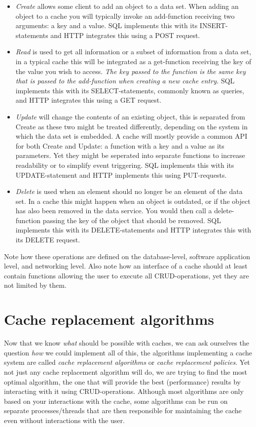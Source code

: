 \documentclass[pdftex,a4paper,12pt,twoside]{report}
\begin{document}
\begin{itemize}
\item \emph{Create} allows some client to add an object to a data set. When adding an object to a cache you will typically invoke an add-function receiving two arguments: a key and a value. SQL implements this with its INSERT-statements and HTTP integrates this using a POST request.
\item \emph{Read} is used to get all information or a subset of information from a data set, in a typical cache this will be integrated as a get-function receiving
the key of the value you wish to access. \emph{The key passed to the function is the same key that is passed to the add-function when creating a new cache entry.} SQL implements this with its SELECT-statements, commonly known as queries, and HTTP integrates this using a GET request.
\item \emph{Update} will change the contents of an existing object, this is separated from Create as these two might be treated differently, depending on the system in which the data set is embedded. A cache will mostly provide a common API for both Create and Update: a function with a key and a value as its parameters. Yet they might be seperated into separate functions to increase readability or to simplify event triggering. SQL implements this with its UPDATE-statement and HTTP implements this using PUT-requests.
\item \emph{Delete} is used when an element should no longer be an element of the data set. In a cache this might happen when an object is outdated, or if the object has also been removed in the data service. You would then call a delete-function passing the key of the object that should be removed. SQL implements this with its DELETE-statements and HTTP integrates this with its DELETE request.
\end{itemize}
\citep{battle2008bridging} Note how these operations are defined on the database-level, software application level, and networking level. Also note how an interface of a cache should at least contain functions allowing the user to execute all CRUD-operations, yet they are not limited by them.
\chapter{Cache replacement algorithms}
Now that we know \emph{what} should be possible with caches, we can ask ourselves the question \emph{how} we could implement all of this, the algorithms implementing a cache system are called \emph{cache replacement algorithms} or \emph{cache replacement policies}. Yet not just any cache replacement algorithm will do, we are trying to find the most optimal algorithm, the one that will provide the best (performance) results by interacting with it using CRUD-operations. 
Although most algorithms are only based on your interactions with the cache, some algorithms can be run on separate processes/threads that are
then responsible for maintaining the cache even without interactions with the user.
\end{document}
